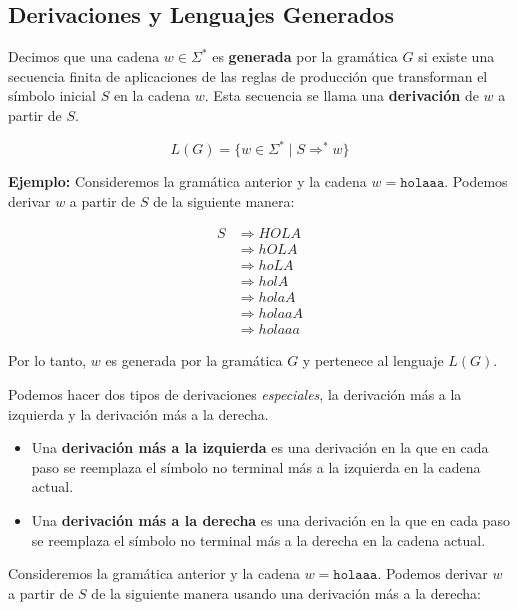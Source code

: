 \subsection{Derivaciones y Lenguajes Generados}
\begin{Def}
    Decimos que una cadena $w \in \Sigma^*$ es \textbf{generada} por la gramática $G$ si existe una secuencia finita de aplicaciones de las reglas de producción que transforman 
    el símbolo inicial $S$ en la cadena $w$. Esta secuencia se llama una \textbf{derivación} de $w$ a partir de $S$.

    $$L(G) = \{ w \in \Sigma^* \mid S \Rightarrow^{*} w \}$$
\end{Def}

\textbf{Ejemplo:} Consideremos la gramática anterior y la cadena $w = \texttt{holaaa}$. Podemos derivar $w$ a partir de $S$ de la siguiente manera:

\begin{align*}
    S &\Rightarrow HOLA \\
    &\Rightarrow hOLA \\
    &\Rightarrow hoLA \\
    &\Rightarrow holA \\
    &\Rightarrow holaA \\
    &\Rightarrow holaaA \\
    &\Rightarrow holaaa
\end{align*}

Por lo tanto, $w$ es generada por la gramática $G$ y pertenece al lenguaje $L(G)$.

\begin{Def}
    Podemos hacer dos tipos de derivaciones \textit{especiales}, la derivación más a la izquierda y la derivación más a la derecha.
    \begin{itemize}
        \item Una \textbf{derivación más a la izquierda} es una derivación en la que en cada paso se reemplaza el símbolo no terminal más a la izquierda en la cadena actual.
        \item Una \textbf{derivación más a la derecha} es una derivación en la que en cada paso se reemplaza el símbolo no terminal más a la derecha en la cadena actual.
    \end{itemize}
\end{Def}

 Consideremos la gramática anterior y la cadena $w = \texttt{holaaa}$. Podemos derivar $w$ a partir de $S$ de la siguiente manera usando una derivación más a la derecha:

